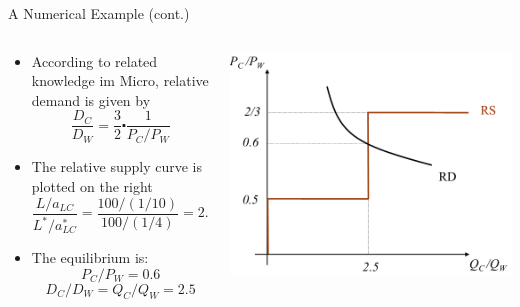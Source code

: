 \documentclass[10pt,hyperref={CJKbookmarks=true},xcolor=dvipsnames,aspectratio=169]{beamer}
\begin{document}
\begin{frame}{A Numerical Example (cont.) }


\begin{columns}[onlytextwidth]
\begin{column}{0.6\textwidth}
\begin{itemize}
\item According to related knowledge im Micro, relative demand is given
by
\[
\frac{D_{C}}{D_{W}}=\frac{3}{2}\centerdot\frac{1}{P_{C}/P_{W}}
\]

\item The relative supply curve is plotted on the right 
\[
\frac{L/a_{LC}}{L^{*}/a_{LC}^{*}}=\frac{100/(1/10)}{100/(1/4)}=2.5
\]

\item The equilibrium is:
\[
P_{C}/P_{W}=0.6
\]
\[
D_{C}/D_{W}=Q_{C}/Q_{W}=2.5
\]

\end{itemize}

\end{column}
\begin{column}{0.4\textwidth}
\includegraphics[width=\columnwidth]{fig/ricardo/lec3-10}
\end{column}
\end{columns}

\end{frame}
\end{document}

